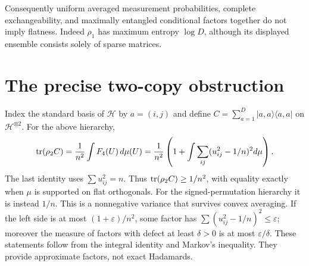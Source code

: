 Consequently uniform averaged measurement probabilities, complete
exchangeability, and maximally entangled conditional factors together
do not imply flatness. Indeed $\rho_1$ has maximum entropy $\log D$,
although its displayed ensemble consists solely of sparse matrices.

\section{The precise two-copy obstruction}
Index the standard basis of $\mathcal H$ by $a=(i,j)$ and define
$C=\sum_{a=1}^D |a,a\rangle\langle a,a|$ on $\mathcal H^{\otimes2}$.
For the above hierarchy,
\begin{equation}\label{s08:coincidence}
 \operatorname{tr}(\rho_2 C)=\frac1{n^2}\int F_4(U)\,d\mu(U)
 =\frac1{n^2}\left(1+\int\sum_{ij}(u_{ij}^2-1/n)^2d\mu\right).
\end{equation}
The last identity uses $\sum u_{ij}^2=n$. Thus $\operatorname{tr}(\rho_2C)\ge1/n^2$,
with equality exactly when $\mu$ is supported on flat orthogonals.
For the signed-permutation hierarchy it is instead $1/n$.
This is a nonnegative variance that survives convex averaging.
If the left side is at most $(1+\varepsilon)/n^2$, some factor has
$\sum(u_{ij}^2-1/n)^2\le\varepsilon$; moreover the measure of factors
with defect at least $\delta>0$ is at most $\varepsilon/\delta$.
These statements follow from the integral identity and Markov's
inequality. They provide approximate factors, not exact Hadamards.

